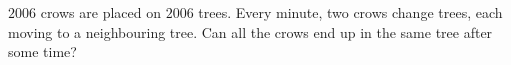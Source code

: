$2006$ crows are placed on $2006$ trees. Every minute, two crows change trees, each moving to a neighbouring tree. Can all the crows end up in the same tree after some time?
